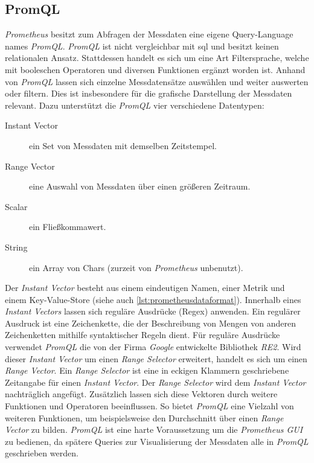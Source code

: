 \documentclass[titlepage]{report}
\begin{document}
\subsection{PromQL}
\emph{Prometheus} besitzt zum Abfragen der Messdaten eine eigene
Query\hyp{}Language names \emph{PromQL}. \emph{PromQL} ist nicht
vergleichbar mit \gls{sql} und besitzt keinen relationalen Ansatz.
Stattdessen handelt es sich um eine Art Filtersprache, welche mit
booleschen Operatoren und diversen Funktionen ergänzt worden ist.
Anhand von \emph{PromQL} lassen sich einzelne Messdatensätze auswählen
und weiter auswerten oder filtern\cite{PROMETHEUS_PROMQL}. Dies ist insbesondere für die
grafische Darstellung der Messdaten relevant. Dazu unterstützt die
\emph{PromQL} vier verschiedene Datentypen\cite{PROMETHEUS_PROMQL}:
\begin{description}
    \item[Instant Vector] ein Set von Messdaten mit demselben
        Zeitstempel.
    \item[Range Vector] eine Auswahl von Messdaten über einen größeren
        Zeitraum.
    \item[Scalar] ein Fließkommawert.
    \item[String] ein Array von Chars (zurzeit von \emph{Prometheus} unbenutzt).
\end{description}
Der \emph{Instant Vector} besteht aus einem eindeutigen Namen, einer Metrik und
einem Key\hyp{}Value\hyp{}Store (siehe auch
\autoref{lst:prometheusdataformat}). Innerhalb eines \emph{Instant Vectors}
lassen sich reguläre Ausdrücke (Regex) anwenden. Ein regulärer Ausdruck ist
eine Zeichenkette, die der Beschreibung von Mengen von anderen Zeichenketten
mithilfe syntaktischer Regeln dient\cite{REGEXWIKI}. Für reguläre Ausdrücke
verwendet \emph{PromQL} die von der Firma \emph{Google} entwickelte Bibliothek
\emph{RE2}\cite{RE2}. Wird dieser \emph{Instant Vector} um einen \emph{Range
Selector} erweitert, handelt es sich um einen \emph{Range Vector}. Ein
\emph{Range Selector} ist eine in eckigen Klammern geschriebene Zeitangabe für
einen \emph{Instant Vector}. Der \emph{Range Selector} wird dem \emph{Instant
Vector} nachträglich angefügt.  Zusätzlich lassen sich diese Vektoren durch
weitere Funktionen und Operatoren beeinflussen. So bietet \emph{PromQL} eine
Vielzahl von weiteren Funktionen, um beispielsweise den Durchschnitt über einen
\emph{Range Vector} zu bilden\cite{PROMETHEUS_PROMQL_FUNCTIONS}. \emph{PromQL}
ist eine harte Voraussetzung um die \emph{Prometheus GUI} zu bedienen, da
spätere Queries zur Visualisierung der Messdaten alle in \emph{PromQL}
geschrieben werden.
\end{document}
